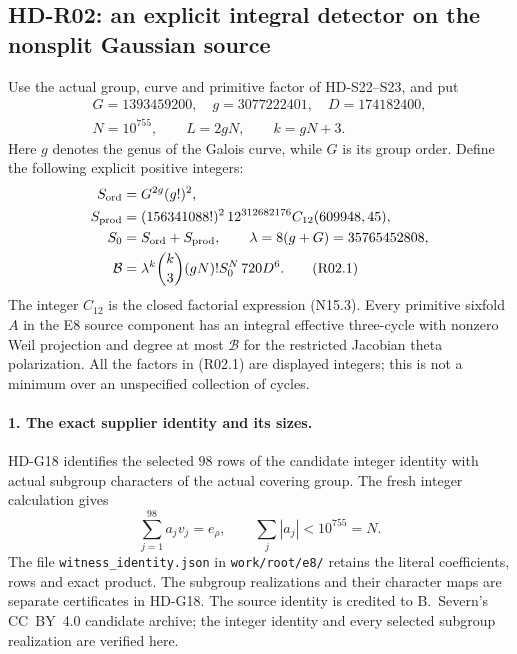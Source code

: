 \subsection{HD-R02: an explicit integral detector on the nonsplit Gaussian source}
\label{sec:HD-R02}

Use the actual group, curve and primitive factor of HD-S22--S23, and put
\[
 \begin{gathered}
 G=1393459200,\quad g=3077222401,\quad D=174182400,\\
 N=10^{755},\qquad L=2gN,\qquad k=gN+3.
 \end{gathered}
\]
Here $g$ denotes the genus of the Galois curve, while $G$ is its group
order. Define the following explicit positive integers:
\begin{align}
 S_{\rm ord}&=G^{2g}(g!)^2,\nonumber\\
 S_{\rm prod}&=(156341088!)^2\,12^{312682176}
                         C_{12}(609948,45),\nonumber\\
 S_0&=S_{\rm ord}+S_{\rm prod},\qquad
 \lambda=8(g+G)=35765452808,\nonumber\\
 \mathcal B&=\lambda^k\binom{k}{3}(gN)!S_0^N\,720D^6.
                                                        \tag{R02.1}
\end{align}
The integer $C_{12}$ is the closed factorial expression (N15.3).
Every primitive sixfold $A$ in the E8 source component has an integral
effective three-cycle with nonzero Weil projection and degree at most
$\mathcal B$ for the restricted Jacobian theta polarization.
All the factors in (R02.1) are displayed integers; this is not a
minimum over an unspecified collection of cycles.

\paragraph{1. The exact supplier identity and its sizes.}
HD-G18 identifies the selected $98$ rows of the candidate integer
identity with actual subgroup characters of the actual covering group.
The fresh integer calculation gives
\[
             \sum_{j=1}^{98}a_jv_j=e_\rho,
             \qquad \sum_j|a_j|<10^{755}=N.           \tag{R02.2}
\]
The file \texttt{witness\_identity.json} in \texttt{work/root/e8/}
retains the literal coefficients, rows and exact product.
The subgroup realizations and their character maps are separate
certificates in HD-G18.
The source identity is credited to B.~Severn's CC~BY~4.0 candidate
archive; the integer identity and every selected subgroup realization
are verified here.

